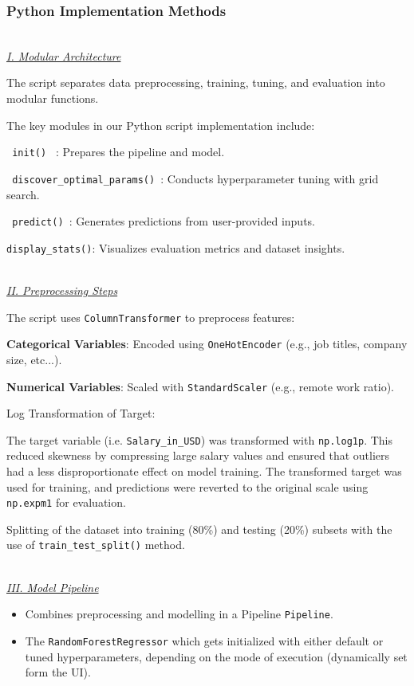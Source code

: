 \documentclass[11pt,a4paper]{article}
\newcommand{\SubItem}[1]{
  {\setlength\itemindent{13pt} \item[◦] #1}
}
\newcommand{\subsubsubsection}[1]{
  {\setlength\itemindent{13pt} \textit{\uline{\\#1\\}}} 
}
\begin{document}
\subsubsection{Python Implementation Methods}
\subsubsubsection{I. Modular Architecture}
\begin{itemize}
\item The script separates data preprocessing, training, tuning, and evaluation into modular functions.
\item The key modules in our Python script implementation include:
\SubItem{\texttt{ init() } : Prepares the pipeline and model.}
\SubItem{\texttt{ discover\_optimal\_params() }: Conducts hyperparameter tuning with grid search.}
\SubItem{\texttt{ predict() }: Generates predictions from user-provided inputs.}
\SubItem{\texttt{display\_stats()}: Visualizes evaluation metrics and dataset insights.}
\end{itemize}

\subsubsubsection{II. Preprocessing Steps}
\begin{itemize}
\item The script uses \texttt{ColumnTransformer} to preprocess features:
\SubItem{\textbf{Categorical Variables}: Encoded using \texttt{OneHotEncoder} (e.g., job titles, company size, etc...).}
\SubItem{\textbf{Numerical Variables}: Scaled with \texttt{StandardScaler} (e.g., remote work ratio).}
\item Log Transformation of Target:
\SubItem{The target variable (i.e. \texttt{Salary\_in\_USD}) was transformed with \texttt{np.log1p}. This reduced skewness by compressing large salary values and ensured that outliers had a less disproportionate effect on model training. The transformed target was used for training, and predictions were reverted to the original scale using \texttt{np.expm1} for evaluation.}
\SubItem{Splitting of the dataset into training (80\%) and testing (20\%) subsets with the use of \texttt{train\_test\_split()} method.}
\end{itemize}


\subsubsubsection{III. Model Pipeline}
\begin{itemize}
\item Combines preprocessing and modelling in a Pipeline \texttt{Pipeline}.
\item The \texttt{RandomForestRegressor} which gets initialized with either default or tuned hyperparameters, depending on the mode of execution (dynamically set form the UI).
\end{itemize}
\end{document}
